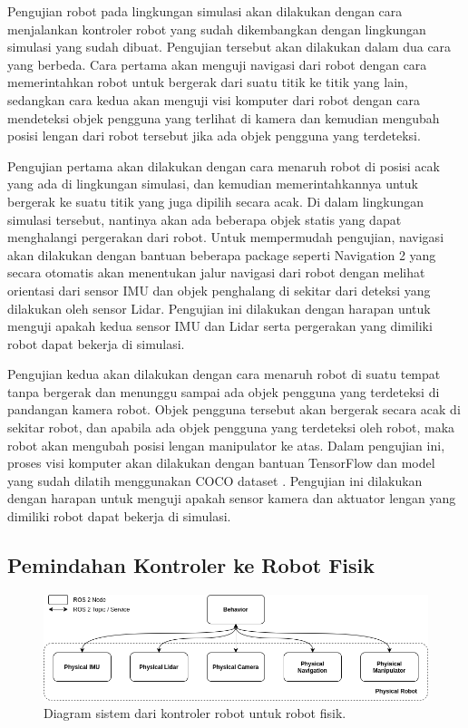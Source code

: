 Pengujian robot pada lingkungan simulasi akan dilakukan dengan cara menjalankan kontroler robot yang sudah dikembangkan dengan lingkungan simulasi yang sudah dibuat.
Pengujian tersebut akan dilakukan dalam dua cara yang berbeda.
Cara pertama akan menguji navigasi dari robot dengan cara memerintahkan robot untuk bergerak dari suatu titik ke titik yang lain, sedangkan cara kedua akan menguji visi komputer dari robot dengan cara mendeteksi objek pengguna yang terlihat di kamera dan kemudian mengubah posisi lengan dari robot tersebut jika ada objek pengguna yang terdeteksi.

Pengujian pertama akan dilakukan dengan cara menaruh robot di posisi acak yang ada di lingkungan simulasi, dan kemudian memerintahkannya untuk bergerak ke suatu titik yang juga dipilih secara acak.
Di dalam lingkungan simulasi tersebut, nantinya akan ada beberapa objek statis yang dapat menghalangi pergerakan dari robot.
Untuk mempermudah pengujian, navigasi akan dilakukan dengan bantuan beberapa package seperti Navigation 2 \citep{Navigation2} yang secara otomatis akan menentukan jalur navigasi dari robot dengan melihat orientasi dari sensor IMU dan objek penghalang di sekitar dari deteksi yang dilakukan oleh sensor Lidar.
Pengujian ini dilakukan dengan harapan untuk menguji apakah kedua sensor IMU dan Lidar serta pergerakan yang dimiliki robot dapat bekerja di simulasi.

Pengujian kedua akan dilakukan dengan cara menaruh robot di suatu tempat tanpa bergerak dan menunggu sampai ada objek pengguna yang terdeteksi di pandangan kamera robot.
Objek pengguna tersebut akan bergerak secara acak di sekitar robot, dan apabila ada objek pengguna yang terdeteksi oleh robot, maka robot akan mengubah posisi lengan manipulator ke atas.
Dalam pengujian ini, proses visi komputer akan dilakukan dengan bantuan TensorFlow \citep{TensorFlow} dan model yang sudah dilatih menggunakan COCO dataset \citep{CocoDataset}.
Pengujian ini dilakukan dengan harapan untuk menguji apakah sensor kamera dan aktuator lengan yang dimiliki robot dapat bekerja di simulasi.

\subsection{Pemindahan Kontroler ke Robot Fisik}

\begin{figure} [ht] \centering
  \includegraphics[scale=0.45]{gambar/controller-transfer.png}
  \caption{Diagram sistem dari kontroler robot untuk robot fisik.}
  \label{fig:ControllerTransfer}
\end{figure}


